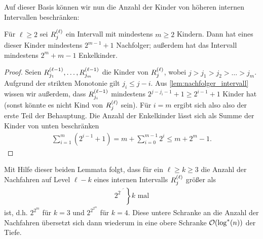 Auf dieser Basis können wir nun die Anzahl der Kinder von höheren internen Intervallen beschränken:
\begin{lemma}
    Für $\ell \ge 2$ sei $R^{(\ell)}_{j}$ ein Intervall mit mindestens $m \ge 2$ Kindern.
    Dann hat eines dieser Kinder mindestens $2^{m-1}+1$ Nachfolger; außerdem hat das Intervall mindestens $2^m + m - 1$ Enkelkinder.
\end{lemma}
\begin{proof}
    Seien $R^{(\ell - 1)}_{j_1}, \ldots, R^{(\ell - 1)}_{j_m}$ die Kinder von $R^{(\ell)}_{j}$, wobei $j > j_1 > j_2 > \ldots > j_m$.
    Aufgrund der strikten Monotonie gilt $j_i \le j - i$.
    Aus \cref{lem:nachfolger_intervall} wissen wir außerdem, dass $R^{(\ell-1)}_{j_i}$ mindestens $2^{j - j_i - 1} + 1 \ge 2^{i-1} + 1$ Kinder hat (sonst könnte es nicht Kind von $R^{(\ell)}_{j}$ sein).
    Für $i = m$ ergibt sich also also der erste Teil der Behauptung.
    Die Anzahl der Enkelkinder lässt sich als Summe der Kinder von unten beschränken
    \begin{align}
        \sum_{i=1}^m (2^{i-1} + 1) = m + \sum_{i=0}^{m-1} 2^i \le m + 2^m - 1.
    \end{align}
\end{proof}

Mit Hilfe dieser beiden Lemmata folgt, dass für ein $\ell \ge k \ge 3$ die Anzahl der Nachfahren auf Level $\ell -k$ eines internen Intervalls $R^{(\ell)}_{j}$ größer als
\def\rddots#1{\cdot^{\cdot^{\cdot^{#1}}}}
\begin{align}
    \left. 2^{2^{\rddots{2^m}}} \right\} \text{$k$ mal}
\end{align}
ist, d.h. $2^{2^m}$ für $k=3$ und $2^{2^{2^m}}$ für $k=4$.
Diese untere Schranke an die Anzahl der Nachfahren übersetzt sich dann wiederum in eine obere Schranke $\mathcal{O}\!\left(\log^*(n)\right)$ der Tiefe.